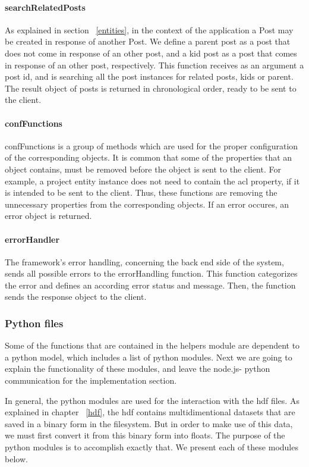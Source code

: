 \paragraph{searchRelatedPosts}
As explained in section ~\ref{entities}, in the context of the application a Post may be created in response of another Post. We define a parent post as a post that does not come in response of an other post, and a kid post as a post that comes in response of an other post, respectively. This function receives as an argument a post id, and is searching all the post instances for related posts, kids or parent. The result object of posts is returned in chronological order, ready to be sent to the client.

\paragraph{confFunctions}
confFunctions is a group of methods which are used for the proper configuration of the corresponding objects. It is common that some of the properties that an object contains, must be removed before the object is sent to the client. For example, a project entity instance does not need to contain the acl property, if it is intended to be sent to the client. Thus, these functions are removing the unnecessary properties from the corresponding objects. If an error occures, an error object is returned.

\paragraph{errorHandler}
	The framework's error handling, concerning the back end side of the system, sends all possible errors to the errorHandling function. This function categorizes the error and defines an according error status and message. Then, the function sends the response object to the client.
	
\subsubsection{Python files}
\label{pyfiles}
Some of the functions that are contained in the helpers module are dependent to a python model, which includes a list of python modules. Next we are going to explain the functionality of these modules, and leave the node.js- python communication for the implementation section. \par 
	In general, the python modules are used for the interaction with the hdf files. As explained in chapter ~\ref{hdf}, the hdf contains multidimentional datasets that are saved in a binary form in the filesystem. But in order to make use of this data, we must first convert it from this binary form into floats. The purpose of the python modules is to accomplish exactly that. We present each of these modules below.
	
